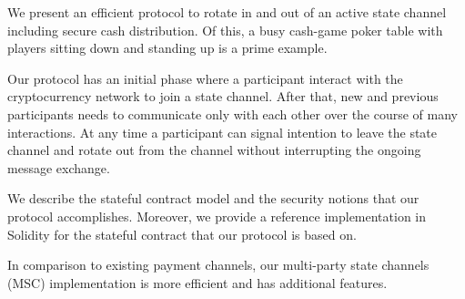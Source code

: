 We present an efficient protocol to rotate in and out of an active state channel including secure cash distribution. Of this, a busy cash-game poker table with players sitting down and standing up is a prime example.
 
Our protocol has an initial phase where a participant interact with the cryptocurrency network to join a state channel. After that, new and previous participants needs to communicate only with each other over the course of many interactions. At any time a participant can signal intention to leave the state channel and rotate out from the channel without interrupting the ongoing message exchange.
 
We describe the stateful contract model and the security notions that our protocol accomplishes. Moreover, we provide a reference implementation in Solidity for the stateful contract that our protocol is based on.

In comparison to existing payment channels, our multi-party state channels (MSC) implementation is more efficient and has additional features.